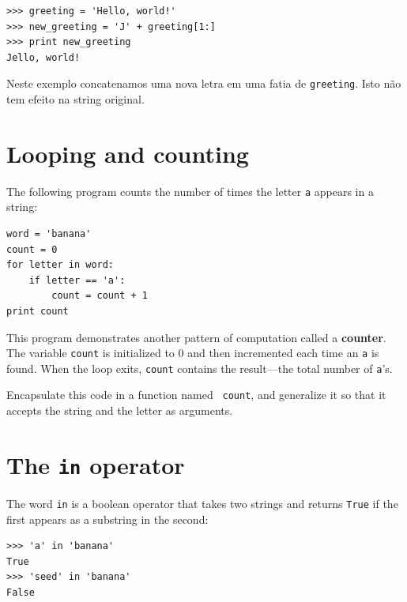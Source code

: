 {\beforeverb
\begin{verbatim}
>>> greeting = 'Hello, world!'
>>> new_greeting = 'J' + greeting[1:]
>>> print new_greeting
Jello, world!
\end{verbatim}
\afterverb
%
%
Neste exemplo concatenamos uma nova letra em uma fatia de {\tt greeting}.
Isto não tem efeito na string original.


\section{Looping and counting}
\label{counter}


The following program counts the number of times the letter {\tt a}
appears in a string:

\beforeverb
\begin{verbatim}
word = 'banana'
count = 0
for letter in word:
    if letter == 'a':
        count = count + 1
print count
\end{verbatim}
\afterverb
%
This program demonstrates another pattern of computation called a {\bf
counter}.  The variable {\tt count} is initialized to 0 and then
incremented each time an {\tt a} is found.
When the loop exits, {\tt count}
contains the result---the total number of {\tt a}'s.

\begin{ex}

Encapsulate this code in a function named {\tt
count}, and generalize it so that it accepts the string and the
letter as arguments.
\end{ex}

\section{The {\tt in} operator}
\label{inboth}


The word {\tt in} is a boolean operator that takes two strings and
returns {\tt True} if the first appears as a substring in the second:

\beforeverb
\begin{verbatim}
>>> 'a' in 'banana'
True
>>> 'seed' in 'banana'
False
\end{verbatim}
\afterverb
%

}
